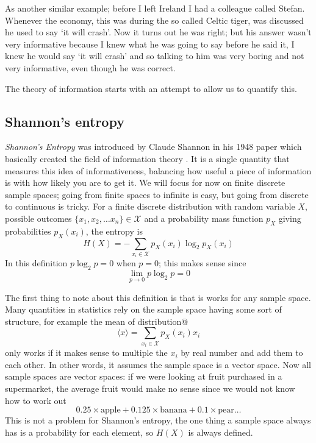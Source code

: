 \documentclass[12pt]{article}
\begin{document}
As another similar example; before I left Ireland I had a colleague
called Stefan. Whenever the economy, this was during the so called
Celtic tiger, was discussed he used to say \lq{}it will
crash\rq{}. Now it turns out he was right; but his answer wasn't very
informative because I knew what he was going to say before he said it,
I knew he would say \lq{}it will crash\rq{} and so talking to him was
very boring and not very informative, even though he was correct.

The theory of information starts with an attempt to allow us to
quantify this. 

\subsection*{Shannon's entropy}


\textsl{Shannon's Entropy} was introduced by Claude Shannon in his
1948 paper which basically created the field of information theory
\citep{Shannon1948}. It is a single quantity that measures this idea of
informativeness, balancing how useful a piece of information is with
how likely you are to get it. We will focus for now on finite discrete
sample spaces; going from finite spaces to infinite is easy, but going
from discrete to continuous is tricky. For a finite discrete
distribution with random variable $X$, possible outcomes
$\{x_1,x_2,\ldots x_n\}\in\mathcal{X}$ and a probability mass function
$p_X$ giving probabilities $p_X(x_i)$, the entropy is
\begin{equation}
H(X)=-\sum_{x_i\in \mathcal{X}}{p_X(x_i)\log_2p_X(x_i)}
\end{equation}
In this definition $p\log_2{p}=0$ when $p=0$; this makes sense since
\begin{equation}
\lim_{p\rightarrow 0}p\log_2{p}=0
\end{equation}


The first thing to note about this definition is that is works for any
sample space. Many quantities in statistics rely on the sample space
having some sort of structure, for example the mean of distribution@
\begin{equation}
\langle x\rangle = \sum_{x_i\in \mathcal{X}}{p_X(x_i)x_i}
\end{equation}
only works if it makes sense to multiple the $x_i$ by real number and
add them to each other. In other words, it assumes the sample space is
a vector space. Now all sample spaces are vector spaces: if we were
looking at fruit purchased in a supermarket, the average fruit would
make no sense since we would not know how to work out
\begin{equation}
0.25\times \mbox{apple}+0.125\times \mbox{banana}+0.1\times \mbox{pear}\ldots
\end{equation}
This is not a problem for Shannon's entropy, the one
thing a sample space always has is a probability for each element, so
$H(X)$ is always defined.
\end{document}
